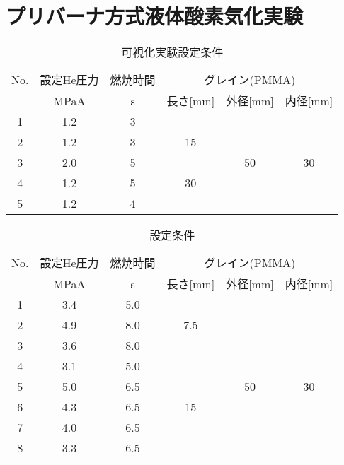 \chapter{プリバーナ方式液体酸素気化実験}
\newcommand{\FigAddThree}{./src/Chapter3/Figure}



\begin{table}[htb]
\begin{center}
\caption{可視化実験設定条件}
\small
\begin{tabular}{|c|c|c|c|c|c|} \hline
No. & 設定He圧力 & 燃焼時間 & \multicolumn{3}{|c|}{グレイン(PMMA)} \\ \cline{2-6}
 & MPaA & s & 長さ[mm] & 外径[mm] & 内径[mm]  \\ \hline
1 & 1.2 & 3 & & & \\ \cline{1-3}
2 & 1.2 & 3 & 15 & & \\ \cline{1-3}
3 & 2.0 & 5 & & 50 & 30  \\ \cline{1-4}
4 & 1.2 & 5 &30  &  & \\ \cline{1-3}
5 & 1.2 & 4 &  &  &  \\ \hline
\end{tabular}
\label{tab:S1TestCondition}
\end{center}
\end{table}

\begin{table}[htb]
\begin{center}
\caption{設定条件}
\small
\begin{tabular}{|c|c|c|c|c|c|} \hline
No. & 設定He圧力 & 燃焼時間 & \multicolumn{3}{|c|}{グレイン(PMMA)} \\ \cline{2-6}
 & MPaA & s & 長さ[mm] & 外径[mm] & 内径[mm]  \\ \hline
1 & 3.4 & 5.0 & & & \\ \cline{1-3}
2 & 4.9 & 8.0 &7.5 & & \\ \cline{1-3}
3 & 3.6 & 8.0 & & & \\ \cline{1-4}
4 & 3.1 & 5.0 & & & \\ \cline{1-4}
5 & 5.0 & 6.5 & & 50 & 30 \\ \cline{1-4}
6 & 4.3 & 6.5 & 15 & &  \\ \cline{1-4}
7 & 4.0 & 6.5 & & &  \\ \cline{1-4}
8 & 3.3 & 6.5 & & &  \\ \hline
\end{tabular}
\label{tab:S2TestCondition}
\end{center}
\end{table}

